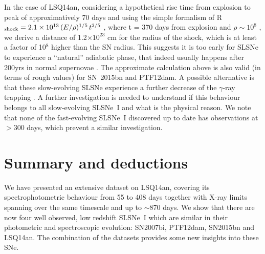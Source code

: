\documentclass[useAMS,usenatbib]{mn2e}
\def\an{LSQ14an}
\begin{document}
In the case of \an\/,  considering a hypothetical rise time from explosion to peak  of approximatively 70 days \citep{ni13,ni16a} and using the simple formalism of R$_{\rm shock} =2.1\times10^{13}\, (E/\rho)^{1/5}\, t^{2/5}$ \citep[][]{re08}, where t = 370 days from explosion and $\rho\sim10^{8}$ \citep[][and Section~\ref{sec:o3}]{je16}, we derive a distance of 1.2$\times10^{23}$ cm for the radius of the shock, which is at least a factor of 10$^8$ higher than the SN radius. This suggests it is too early for SLSNe to experience a ``natural'' adiabatic phase, that indeed usually happens after 200yrs in normal supernovae \citep{re08}. 
 The approximate calculation above is also valid (in terms of rough values) for 
 SN~2015bn and PTF12dam. 
A possible alternative is that these slow-evolving SLSNe experience a further decrease of the $\gamma$-ray trapping \citep[see also][]{ch15,ni16b}. A further investigation is needed to understand if this behaviour belongs to all slow-evolving SLSNe~I and what is
the physical reason. We note that none of the fast-evolving SLSNe~I discovered up to date has observations at $>300$ days, which prevent a similar investigation.


\section{Summary and deductions}\label{sec:conc}

We have presented an extensive dataset on 
\an, covering its spectrophotometric behaviour from 55 to 408 days together with X-ray limits spanning over the same timescale and up to $\sim$870 days.  We show that there are now four well observed, low redshift SLSNe~I which are similar in their photometric
and spectroscopic evolution: SN2007bi, PTF12dam, SN2015bn and LSQ14an. The combination of the datasets provides
some new insights into these SNe.
\end{document}
